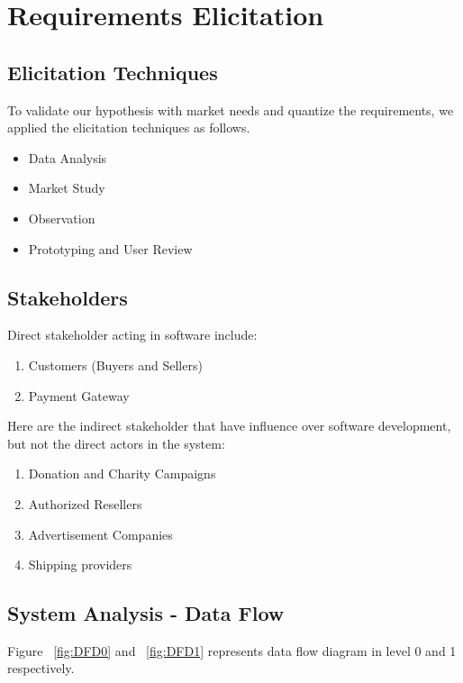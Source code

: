 %
%
\chapter{Requirements Elicitation}

\section{Elicitation Techniques}

To validate our hypothesis with market needs and quantize the requirements, we applied the elicitation techniques as follows.

\begin{itemize}
	\item Data Analysis
	\item Market Study
	\item Observation
	\item Prototyping and User Review
\end{itemize}

\section{Stakeholders}

Direct stakeholder acting in software include:

\begin{enumerate}
	\item Customers (Buyers and Sellers)
	\item Payment Gateway
\end{enumerate}

Here are the indirect stakeholder that have influence over software development, but not the direct actors in the system:

\begin{enumerate}
	\item Donation and Charity Campaigns
	\item Authorized Resellers
	\item Advertisement Companies
	\item Shipping providers
\end{enumerate}

\section{System Analysis - Data Flow}

Figure ~\ref{fig:DFD0} and ~\ref{fig:DFD1} represents data flow diagram in level 0 and 1 respectively.

